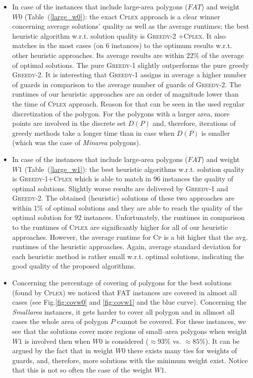 \documentclass[runningheads,a4paper]{elsarticle}
\begin{document}
\begin{itemize}
     	\item In case of the instances that include large-area polygons ($FAT$) and weight $W0$ (Table~(\ref{large_w0}): the exact \textsc{Cplex} approach is a clear winner concerning average solutions' quality as well as the average runtimes;  the best heuristic algorithm w.r.t. solution quality is \textsc{Greedy-2 +Cplex}. It also matches in the most cases (on 6 instances) to the optimum results w.r.t. other heuristic approaches. Its average results are within 22\% of the average of  optimal solutions.  The pure \textsc{Greedy-1} slightly outperforms the pure greedy \textsc{Greedy-2}. It is interesting that \textsc{Greedy-1} assigns in average a  higher number of guards in comparison to the average number of guards of \textsc{Greedy-2}. The runtimes of our heuristic approaches are an order of magnitude lower than the time of \textsc{Cplex} approach. Reason for that can be seen in the used regular discretization of the polygon. For the polygons with a larger area, more points are involved in the discrete set $D(P)$ and, therefore, iterations of greedy methods take a longer time than in case when $D(P)$ is smaller (which was the case of \emph{Minarea} polygons).
     	\item  In case of the instances that include large-area polygons ($FAT$) and weight $W1$ (Table~(\ref{large_w1}): the best heuristic algorithms w.r.t. solution quality is \textsc{Greedy-1+Cplex} which is able to match in 96 instances the quality of optimal solutions. Slightly worse results are delivered by \textsc{Greedy-1} and \textsc{Greedy-2}. The obtained (heuristic) solutions of these two approaches are within 1\% of optimal solutions and they are
     	able to reach the quality of the optimal solution for 92 instances. Unfortunately, the runtimes in comparison to the runtimes of \textsc{Cplex} are significantly higher for all of our heuristic approaches. However, the average runtime for \textsc{Cp} is a bit higher that the avg. runtimes of the heuristic approaches. Again, average standard deviation for each heuristic method is rather small w.r.t. optimal solutions, indicating the good quality of the proposed algorithms.
     	\item  Concerning the percentage of covering of polygons for the best solutions (found by \textsc{Cplex}) we
     	noticed that  \textsc{FAT} instances are covered in almost all cases (see Fig.\ref{fig:covw0} and \ref{fig:covw1} and the blue curve). Concerning the \textit{Smallarea} instances, it gets harder to cover all polygon and in allmost all cases the whole area of polygon $P$ cannot be covered. For these instances, we see that the solutions cover more regions of small--area polygons when weight $W1$ is involved then when $W0$ is considered ($\approx 93 \%$ vs. $\approx 85\%$). It can be argued by the fact that in weight $W0$ there exists many ties for weights of guards, and, therefore, more solutions with the minimum weight exist. 
     	Notice that this is not so often the case of the weight $W1$. 
     	
     \end{itemize}
\end{document}
